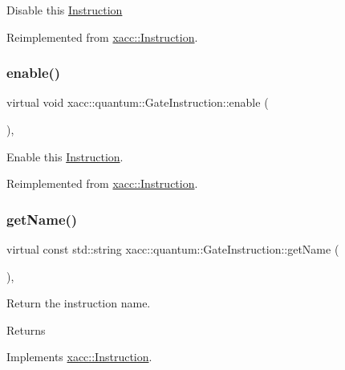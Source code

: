 Disable this \hyperlink{a02460}{Instruction} 

Reimplemented from \hyperlink{a02460_a6e528da15e05a94cc1d7db268c483271}{xacc\+::\+Instruction}.

\mbox{\label{a01276_a7a80474b7fd465271b3313432db2e608}} 
\subsubsection{\texorpdfstring{enable()}{enable()}}
{\footnotesize\ttfamily virtual void xacc\+::quantum\+::\+Gate\+Instruction\+::enable (\begin{DoxyParamCaption}{ }\end{DoxyParamCaption})\hspace{0.3cm}{\ttfamily [inline]}, {\ttfamily [virtual]}}

Enable this \hyperlink{a02460}{Instruction}. 

Reimplemented from \hyperlink{a02460_a0b4f2e5a591af28342a3c08e4305e24f}{xacc\+::\+Instruction}.

\mbox{\label{a01276_a0db03b9e46eeba1134f0ca2b83ccc842}} 
\subsubsection{\texorpdfstring{get\+Name()}{getName()}}
{\footnotesize\ttfamily virtual const std\+::string xacc\+::quantum\+::\+Gate\+Instruction\+::get\+Name (\begin{DoxyParamCaption}{ }\end{DoxyParamCaption})\hspace{0.3cm}{\ttfamily [inline]}, {\ttfamily [virtual]}}

Return the instruction name. \begin{DoxyReturn}{Returns}

\end{DoxyReturn}


Implements \hyperlink{a02460_ac7ff23f693e2276edbf3fdac5452792c}{xacc\+::\+Instruction}.

